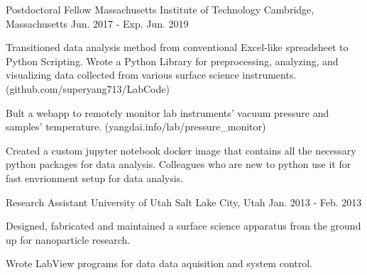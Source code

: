


\begin{cventries}


\cventry
{Postdoctoral Fellow} %
{Massachusetts Institute of Technology} %
{Cambridge, Massachusetts} %
{Jun. 2017 - Exp. Jun. 2019} %
{ %
\begin{cvitems}
\item {Transitioned data analysis method from conventional Excel-like
    spreadsheet to Python Scripting. Wrote a Python Library for preprocessing,
    analyzing, and visualizing data collected from various surface science
    instruments. (github.com/superyang713/LabCode)}
\item {Bult a webapp to remotely monitor lab instruments' vacuum pressure and
    samples' temperature. (yangdai.info/lab/pressure\_monitor)}
\item {Created a custom jupyter notebook docker image that contains all the
    necessary python packages for data analysis. Colleagues who are new to
    python use it for fast envrionment setup for data analysis.}
\end{cvitems}
}


\cventry
{Research Assistant}
{University of Utah}
{Salt Lake City, Utah}
{Jan. 2013 - Feb. 2013}
{
\begin{cvitems}
\item {Designed, fabricated and maintained a surface science apparatus from the
    ground up for nanoparticle research.}
\item {Wrote LabView programs for data data aquisition and system control.}
\end{cvitems}
}


\end{cventries}